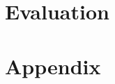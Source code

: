 \documentclass[
paper=a4,
fontsize = 12pt, %
headsepline,     %
titlepage,       %
numbers=noenddot,
headings=optiontohead, %
]{scrbook}
\begin{document}
\part{Evaluation}\label{part:evaluation}






\appendix
\part*{Appendix}\label{part:appendix}

\printbibliography
\end{document}
